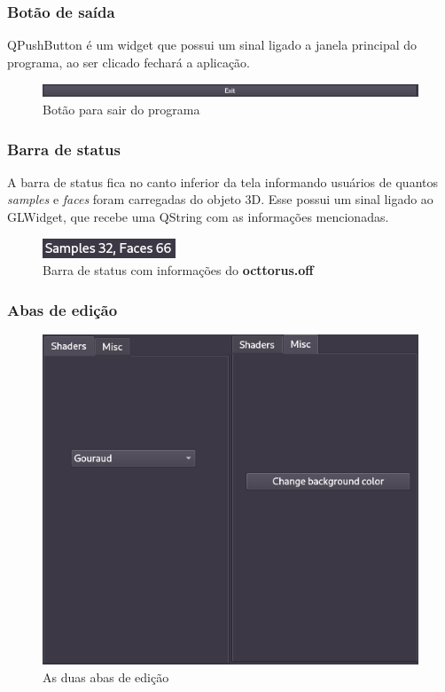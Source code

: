 \documentclass{ol-softwaremanual}
\begin{document}
\subsubsection{Botão de saída}

QPushButton é um widget que possui um sinal ligado a janela principal do programa,
ao ser clicado fechará a aplicação.

\begin{figure}[H]
    \centering
    \includegraphics[width=\textwidth]{botao-saida.png}
    \caption{Botão para sair do programa}
\end{figure}

\subsubsection{Barra de status}

A barra de status fica no canto inferior da tela 
informando usuários de quantos \emph{samples} e \emph{faces} foram carregadas 
do objeto 3D.
Esse possui um sinal ligado ao GLWidget, que recebe 
uma QString com as informações mencionadas.

\begin{figure}[H]
    \centering
    \includegraphics[width=.3\textwidth]{status-bar.png}
    \caption{Barra de status com informações do \textbf{octtorus.off}}
\end{figure}

\newpage

\subsubsection{Abas de edição}

\begin{figure}[H]
    \centering
    \includegraphics[width=.5\textwidth]{abadeedicao.jpg}
    \caption{As duas abas de edição}
\end{figure}
\end{document}
